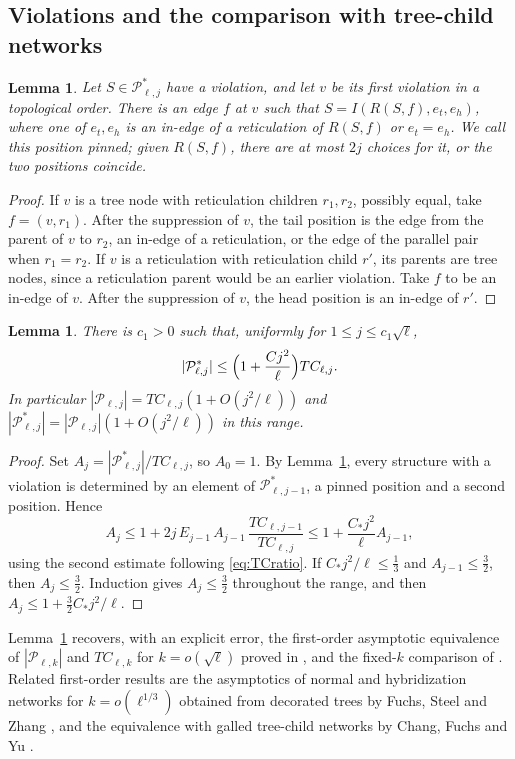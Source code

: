\documentclass[11pt,a4paper]{article}
\newtheorem{lemma}[theorem]{Lemma}
\theoremstyle{definition}
\newcommand{\cP}{\mathcal{P}}
\begin{document}
\subsection{Violations and the comparison with tree-child networks}

\begin{lemma}\label{lem:pinning}
Let $S\in\cP^*_{\ell,j}$ have a violation, and let $v$ be its first violation in a topological order. There is an edge $f$ at $v$ such that $S=I(R(S,f),e_t,e_h)$, where one of $e_t,e_h$ is an in-edge of a reticulation of $R(S,f)$ or $e_t=e_h$. We call this position pinned; given $R(S,f)$, there are at most $2j$ choices for it, or the two positions coincide.
\end{lemma}

\begin{proof}
If $v$ is a tree node with reticulation children $r_1,r_2$, possibly equal, take $f=(v,r_1)$. After the suppression of $v$, the tail position is the edge from the parent of $v$ to $r_2$, an in-edge of a reticulation, or the edge of the parallel pair when $r_1=r_2$. If $v$ is a reticulation with reticulation child $r'$, its parents are tree nodes, since a reticulation parent would be an earlier violation. Take $f$ to be an in-edge of $v$. After the suppression of $v$, the head position is an in-edge of $r'$.
\end{proof}

\begin{lemma}\label{lem:nontc}
There is $c_1>0$ such that, uniformly for $1\le j\le c_1\sqrt\ell$,
\[
|\cP^*_{\ell,j}|\le\Bigl(1+\frac{Cj^2}{\ell}\Bigr)TC_{\ell,j}.
\]
In particular $|\cP_{\ell,j}|=TC_{\ell,j}(1+O(j^2/\ell))$ and $|\cP^*_{\ell,j}|=|\cP_{\ell,j}|(1+O(j^2/\ell))$ in this range.
\end{lemma}

\begin{proof}
Set $A_j=|\cP^*_{\ell,j}|/TC_{\ell,j}$, so $A_0=1$. By Lemma~\ref{lem:pinning}, every structure with a violation is determined by an element of $\cP^*_{\ell,j-1}$, a pinned position and a second position. Hence
\[
A_j\le1+2j\,E_{j-1}\,A_{j-1}\,\frac{TC_{\ell,j-1}}{TC_{\ell,j}}\le1+\frac{C_*j^2}{\ell}A_{j-1},
\]
using the second estimate following \eqref{eq:TCratio}. If $C_*j^2/\ell\le\frac13$ and $A_{j-1}\le\frac32$, then $A_j\le\frac32$. Induction gives $A_j\le\frac32$ throughout the range, and then $A_j\le1+\frac32C_*j^2/\ell$.
\end{proof}

Lemma~\ref{lem:nontc} recovers, with an explicit error, the first-order asymptotic equivalence of $|\cP_{\ell,k}|$ and $TC_{\ell,k}$ for $k=o(\sqrt\ell)$ proved in \cite[Thm.~4.2]{YZasym}, and the fixed-$k$ comparison of \cite[Prop.~4.8]{Mansouri22}. Related first-order results are the asymptotics of normal and hybridization networks for $k=o(\ell^{1/3})$ obtained from decorated trees by Fuchs, Steel and Zhang \cite{FSZ}, and the equivalence with galled tree-child networks by Chang, Fuchs and Yu \cite{CFY}.
\end{document}
